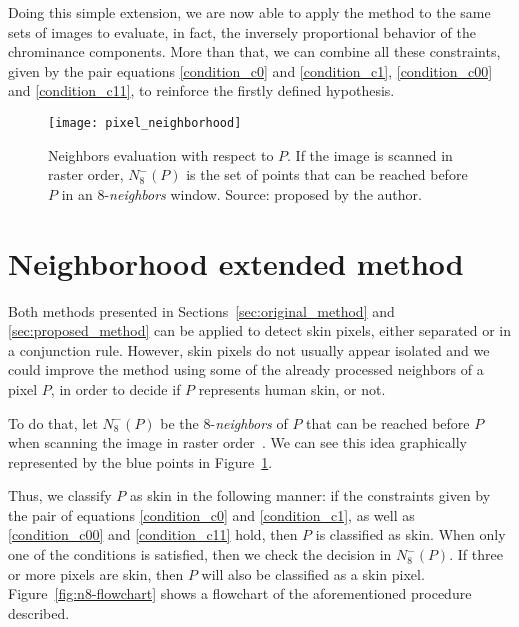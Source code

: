 Doing this simple extension, we are now able to apply the method to the same sets of images to evaluate, in fact, the inversely proportional behavior of the chrominance components. More than that, we can combine all these constraints, given by the pair equations \ref{condition_c0} and \ref{condition_c1}, \ref{condition_c00} and \ref{condition_c11}, to reinforce the firstly defined hypothesis.


\begin{figure}[!htp]
    \centering
    \texttt{[image: pixel\_neighborhood]}
    \caption[Neighbors evaluation with respect to a pixel $P$]{Neighbors evaluation with respect to $P$. If the image is scanned in raster order, $N_8^-(P)$ is the set of points that can be reached before $P$ in an 8-\textit{neighbors} window. Source: proposed by the author.}
    \label{fig:pixel_neighborhood}
\end{figure}


\section{Neighborhood extended method}
\label{sec:neighborhood_extended_method}
Both methods presented in Sections~\ref{sec:original_method} and \ref{sec:proposed_method} can be applied to detect skin pixels, either separated or in a conjunction rule. However, skin pixels do not usually appear isolated and we could improve the method using some of the already processed neighbors of a pixel $P$, in order to decide if $P$ represents human skin, or not.

To do that, let $N_8^-(P)$ be the 8-\textit{neighbors} of $P$ that can be reached before $P$ when scanning the image in raster order~\citep{rosenfeld:66}. We can see this idea graphically represented by the blue points in Figure~\ref{fig:pixel_neighborhood}.

Thus, we classify $P$ as skin in the following manner: if the constraints given by the pair of equations \ref{condition_c0} and \ref{condition_c1}, as well as \ref{condition_c00} and \ref{condition_c11} hold, then $P$ is classified as skin. When only one of the conditions is satisfied, then we check the decision in $N_8^-(P)$. If three or more pixels are skin, then $P$ will also be classified as a skin pixel. Figure~\ref{fig:n8-flowchart} shows a flowchart of the aforementioned procedure described.

